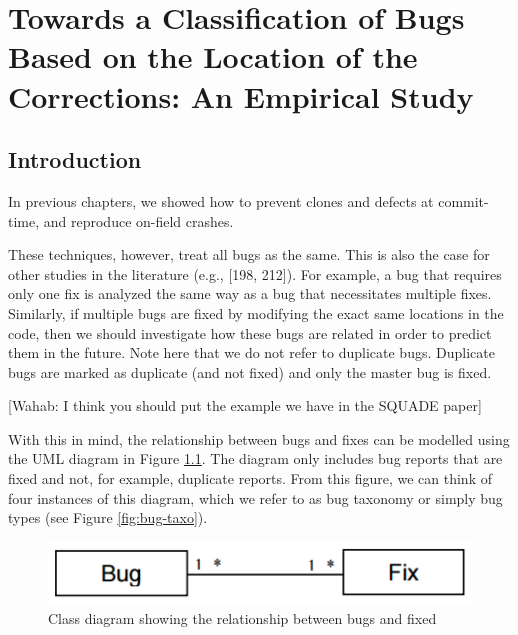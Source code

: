 \documentclass[12pt]{report}
\begin{document}
\chapter{Towards a Classification of Bugs Based on the Location of the
Corrections: An Empirical
Study}\label{towards-a-classification-of-bugs-based-on-the-location-of-the-corrections-an-empirical-study}

\section{Introduction}\label{introduction-5}

In previous chapters, we showed how to prevent clones and
defects at commit-time, and reproduce on-field crashes.

These techniques, however, treat all bugs as the same.  This is also the case for other studies in the literature (e.g., {[}198, 212{]}). For example, a bug that requires only one fix is analyzed the same way as a bug that necessitates multiple fixes. Similarly, if multiple bugs are fixed by modifying the exact same locations in the code, then we should investigate how these bugs are related in order to predict them in the future. Note here that we do not refer to duplicate bugs. Duplicate bugs are marked as duplicate (and not fixed) and only the master bug is fixed.

[Wahab: I think you should put the example we have in the SQUADE paper]

With this in mind, the relationship between bugs and fixes can be
modelled using the UML diagram in Figure \ref{fig:bug-taxo-diag}. The
diagram only includes bug reports that are fixed and not, for example,
duplicate reports. From this figure, we can think of four instances of
this diagram, which we refer to as bug taxonomy or simply bug types (see
Figure \ref{fig:bug-taxo}).

\begin{figure}[h!]
  \centering
    \includegraphics[scale=0.5]{media/chap9/bug-taxo-class-diag.png}
    \caption{Class diagram showing the relationship between bugs and fixed
    \label{fig:bug-taxo-diag}}
\end{figure}
\end{document}
